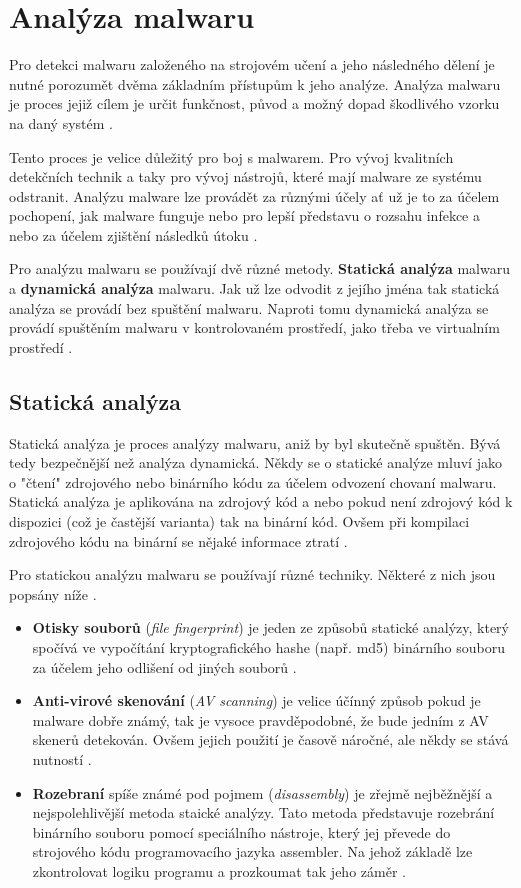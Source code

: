 \section{Analýza malwaru} \label{analysis}
Pro detekci malwaru založeného na strojovém učení a jeho následného dělení je nutné porozumět dvěma základním přístupům k jeho analýze. Analýza malwaru je proces jejiž cílem je určit funkčnost, původ a možný dopad škodlivého vzorku na daný systém \cite{analysis_wiki}.

Tento proces je velice důležitý pro boj s malwarem. Pro vývoj kvalitních detekčních technik a taky pro vývoj nástrojů, které mají malware ze systému odstranit. Analýzu malware lze provádět za různými účely ať už je to za účelem pochopení, jak malware funguje
nebo pro lepší představu o rozsahu infekce a nebo za účelem zjištění následků útoku \cite{article_analysis_goat}.

Pro analýzu malwaru se používají dvě různé metody. \textbf{Statická analýza} malwaru a \textbf{dynamická analýza} malwaru. 
Jak už lze odvodit z jejího jména tak statická analýza se provádí bez spuštění malwaru. Naproti tomu dynamická analýza se provádí spuštěním malwaru v kontrolovaném prostředí, 
jako třeba ve virtualním prostředí \cite{article_analysis}.

\subsection*{Statická analýza}
Statická analýza je proces analýzy malwaru, aniž by byl skutečně spuštěn. Bývá tedy bezpečnější než analýza dynamická. Někdy se o statické analýze mluví jako o "čtení" zdrojového nebo binárního kódu za účelem
odvození chovaní malwaru. Statická analýza je aplikována na zdrojový kód a nebo pokud není zdrojový kód k dispozici (což je častější varianta) tak na binární kód. Ovšem při kompilaci zdrojového kódu na binární se nějaké informace ztratí \cite{article_analysis_goat,static_analysis}.

Pro statickou analýzu malwaru se používají různé techniky. Některé z nich jsou popsány níže \cite{malware_d_s}.
\begin{itemize}
    \item \textbf{Otisky souborů} (\textit{file fingerprint}) je jeden ze způsobů statické analýzy, který spočívá ve vypočítání kryptografického hashe (např. md5) binárního souboru za účelem jeho odlišení od jiných souborů \cite{static_analysis}.
    \item \textbf{Anti-virové skenování} (\textit{AV scanning}) je velice účínný způsob pokud je malware dobře známý, tak je vysoce pravděpodobné, že bude jedním z AV skenerů detekován. Ovšem jejich použití je časově náročné, ale někdy se stává nutností \cite{article_analysis_goat}.
    \item \textbf{Rozebraní} spíše známé pod pojmem (\textit{disassembly}) je zřejmě nejběžnější a nejspolehlivější metoda staické analýzy. Tato metoda představuje rozebrání binárního souboru pomocí speciálního nástroje, který jej převede do strojového kódu programovacího jazyka assembler. Na jehož základě lze zkontrolovat logiku programu a prozkoumat tak jeho záměr \cite{article_analysis_goat}. 
\end{itemize}

